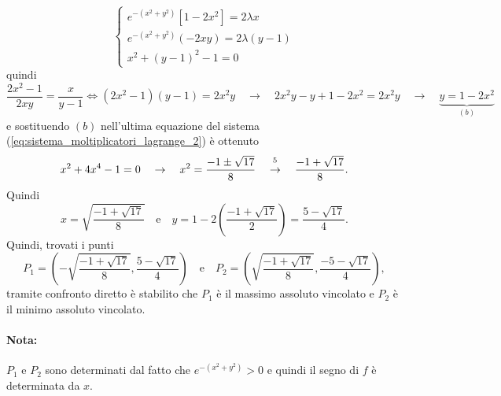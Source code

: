 \begin{example}
 	\begin{equation}\label{eq:sistema_moltiplicatori_lagrange_2}
 		\begin{cases}
 			e^{-(x^2+y^2)} [1-2x^2] = 2\lambda x\\
 		e^{-(x^2+y^2)}(-2xy) = 2 \lambda (y-1)\\
 		x^2 + (y-1)^2 - 1 =0
 		\end{cases}
 	\end{equation}
 	quindi
 	\begin{equation*}
 		\frac{2x^2 - 1}{2xy} = \frac{x}{y-1} \iff (2x^2 - 1)(y-1) = 2x^2y \quad\rightarrow\quad 2x^2y - y + 1 - 2x^2 = 2x^2y \quad\rightarrow\quad\underbrace{y = 1-2x^2}_{(b)}
 	\end{equation*}
 	e sostituendo $(b)$ nell'ultima equazione del sistema (\ref{eq:sistema_moltiplicatori_lagrange_2}) è ottenuto
 	\begin{equation*}
 		x^2 + 4x^4 - 1 = 0 \quad\rightarrow\quad x^2 = \frac{-1 \pm \sqrt{17}}{8} \quad\overset{\boldsymbol{\footnotemark}}{\rightarrow}\quad \frac{-1 + \sqrt{17}}{8}.
 	\end{equation*}
 	Quindi
 	\begin{equation*}
 		x = \sqrt{\frac{-1 + \sqrt{17}}{8}}\quad\text{e}\quad y = 1 - 2\left(\frac{-1 + \sqrt{17}}{2}\right) = \frac{5 - \sqrt{17}}{4}.
 	\end{equation*}
 	Quindi, trovati i punti
 	\begin{equation*}
 		P_1 = \left(-\sqrt{\frac{-1 + \sqrt{17}}{8}}, \frac{5 - \sqrt{17}}{4}\right)\quad\text{e}\quad P_2 = \left(\sqrt{\frac{-1 + \sqrt{17}}{8}}, \frac{-5 - \sqrt{17}}{4}\right),
 	\end{equation*}
 	tramite confronto diretto è stabilito che $P_1$ è il massimo assoluto vincolato e $P_2$ è il minimo assoluto vincolato.
 	
 	\paragraph{Nota:} $P_1$ e $P_2$ sono determinati dal fatto che $e^{-(x^2+y^2)}>0$ e quindi il segno di $f$ è determinata da $x$.
\end{example}
